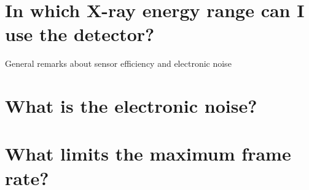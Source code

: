 
\section{In which X-ray energy range can I use the detector?}

General remarks about sensor efficiency and electronic noise

\section{What is the electronic noise?}\label{sec:noise}


\section{What limits the maximum frame rate?}

